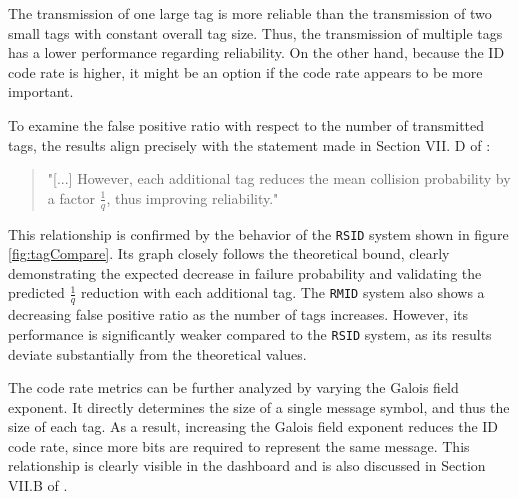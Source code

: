 \documentclass[english,BCOR=4mm,cdfont=false]{tudscrreprt} %
\begin{document}

The transmission of one large tag is more reliable than the transmission of two small tags with constant overall tag size. Thus, the transmission of multiple tags has a lower performance regarding reliability. On the other hand, because the ID code rate is higher, it might be an option if the code rate appears to be more important.

To examine the false positive ratio with respect to the number of transmitted tags, the results align precisely with the statement made in Section VII. D of \cite{Codes_for_ID_Tutorial}:

\begin{quote}

"[...] However, each additional tag reduces the mean collision probability by a factor $\frac{1}{q}$, thus improving reliability." 
 
\end{quote}

This relationship is confirmed by the behavior of the \texttt{RSID} system shown in figure \ref{fig:tagCompare}. Its graph closely follows the theoretical bound, clearly demonstrating the expected decrease in failure probability and validating the predicted $\frac{1}{q}$ reduction with each additional tag. The \texttt{RMID} system also shows a decreasing false positive ratio as the number of tags increases. However, its performance is significantly weaker compared to the \texttt{RSID} system, as its results deviate substantially from the theoretical values.

The code rate metrics can be further analyzed by varying the Galois field exponent. It directly determines the size of a single message symbol, and thus the size of each tag. As a result, increasing the Galois field exponent reduces the ID code rate, since more bits are required to represent the same message. This relationship is clearly visible in the dashboard and is also discussed in Section VII.B of \cite{Codes_for_ID_Tutorial}. 
\end{document}
